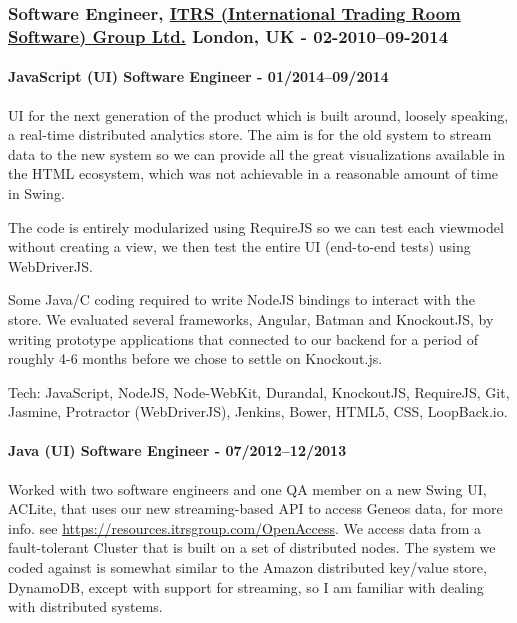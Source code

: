 \documentclass[
  a4paper,
]{article}
\begin{document}
\hypertarget{software-engineer-itrs-international-trading-room-software-group-ltd.-london-uk---02-201009-2014}{%
\subsubsection{\texorpdfstring{Software Engineer,
\href{https://www.itrsgroup.com}{ITRS (International Trading Room
Software) Group Ltd.} London, UK -
02-2010--09-2014}{Software Engineer, ITRS (International Trading Room Software) Group Ltd. London, UK - 02-2010--09-2014}}\label{software-engineer-itrs-international-trading-room-software-group-ltd.-london-uk---02-201009-2014}}

\hypertarget{javascript-ui-software-engineer---012014092014}{%
\paragraph{JavaScript (UI) Software Engineer -
01/2014--09/2014}\label{javascript-ui-software-engineer---012014092014}}

UI for the next generation of the product which is built around, loosely
speaking, a real-time distributed analytics store. The aim is for the
old system to stream data to the new system so we can provide all the
great visualizations available in the HTML ecosystem, which was not
achievable in a reasonable amount of time in Swing.

The code is entirely modularized using RequireJS so we can test each
viewmodel without creating a view, we then test the entire UI
(end-to-end tests) using WebDriverJS.

Some Java/C coding required to write NodeJS bindings to interact with
the store. We evaluated several frameworks, Angular, Batman and
KnockoutJS, by writing prototype applications that connected to our
backend for a period of roughly 4-6 months before we chose to settle on
Knockout.js.

Tech: JavaScript, NodeJS, Node-WebKit, Durandal, KnockoutJS, RequireJS,
Git, Jasmine, Protractor (WebDriverJS), Jenkins, Bower, HTML5, CSS,
LoopBack.io.

\hypertarget{java-ui-software-engineer---072012122013}{%
\paragraph{Java (UI) Software Engineer -
07/2012--12/2013}\label{java-ui-software-engineer---072012122013}}

Worked with two software engineers and one QA member on a new Swing UI,
ACLite, that uses our new streaming-based API to access Geneos data, for
more info. see \url{https://resources.itrsgroup.com/OpenAccess}. We
access data from a fault-tolerant Cluster that is built on a set of
distributed nodes. The system we coded against is somewhat similar to
the Amazon distributed key/value store, DynamoDB, except with support
for streaming, so I am familiar with dealing with distributed systems.
\end{document}
